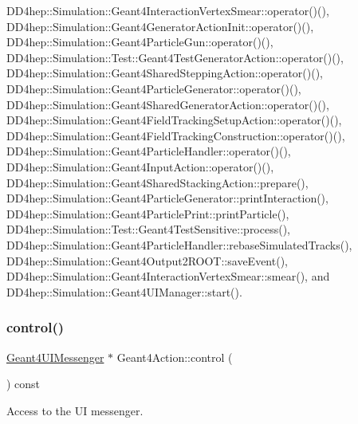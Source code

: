 D\+D4hep\+::\+Simulation\+::\+Geant4\+Interaction\+Vertex\+Smear\+::operator()(), D\+D4hep\+::\+Simulation\+::\+Geant4\+Generator\+Action\+Init\+::operator()(), D\+D4hep\+::\+Simulation\+::\+Geant4\+Particle\+Gun\+::operator()(), D\+D4hep\+::\+Simulation\+::\+Test\+::\+Geant4\+Test\+Generator\+Action\+::operator()(), D\+D4hep\+::\+Simulation\+::\+Geant4\+Shared\+Stepping\+Action\+::operator()(), D\+D4hep\+::\+Simulation\+::\+Geant4\+Particle\+Generator\+::operator()(), D\+D4hep\+::\+Simulation\+::\+Geant4\+Shared\+Generator\+Action\+::operator()(), D\+D4hep\+::\+Simulation\+::\+Geant4\+Field\+Tracking\+Setup\+Action\+::operator()(), D\+D4hep\+::\+Simulation\+::\+Geant4\+Field\+Tracking\+Construction\+::operator()(), D\+D4hep\+::\+Simulation\+::\+Geant4\+Particle\+Handler\+::operator()(), D\+D4hep\+::\+Simulation\+::\+Geant4\+Input\+Action\+::operator()(), D\+D4hep\+::\+Simulation\+::\+Geant4\+Shared\+Stacking\+Action\+::prepare(), D\+D4hep\+::\+Simulation\+::\+Geant4\+Particle\+Generator\+::print\+Interaction(), D\+D4hep\+::\+Simulation\+::\+Geant4\+Particle\+Print\+::print\+Particle(), D\+D4hep\+::\+Simulation\+::\+Test\+::\+Geant4\+Test\+Sensitive\+::process(), D\+D4hep\+::\+Simulation\+::\+Geant4\+Particle\+Handler\+::rebase\+Simulated\+Tracks(), D\+D4hep\+::\+Simulation\+::\+Geant4\+Output2\+R\+O\+O\+T\+::save\+Event(), D\+D4hep\+::\+Simulation\+::\+Geant4\+Interaction\+Vertex\+Smear\+::smear(), and D\+D4hep\+::\+Simulation\+::\+Geant4\+U\+I\+Manager\+::start().

\hypertarget{class_d_d4hep_1_1_simulation_1_1_geant4_action_a1bdb7c4a8b5a40c4fbae05068c1e8c93}{}\label{class_d_d4hep_1_1_simulation_1_1_geant4_action_a1bdb7c4a8b5a40c4fbae05068c1e8c93} 
\subsubsection{\texorpdfstring{control()}{control()}}
{\footnotesize\ttfamily \hyperlink{class_d_d4hep_1_1_simulation_1_1_geant4_u_i_messenger}{Geant4\+U\+I\+Messenger} $\ast$ Geant4\+Action\+::control (\begin{DoxyParamCaption}{ }\end{DoxyParamCaption}) const}



Access to the UI messenger. 




